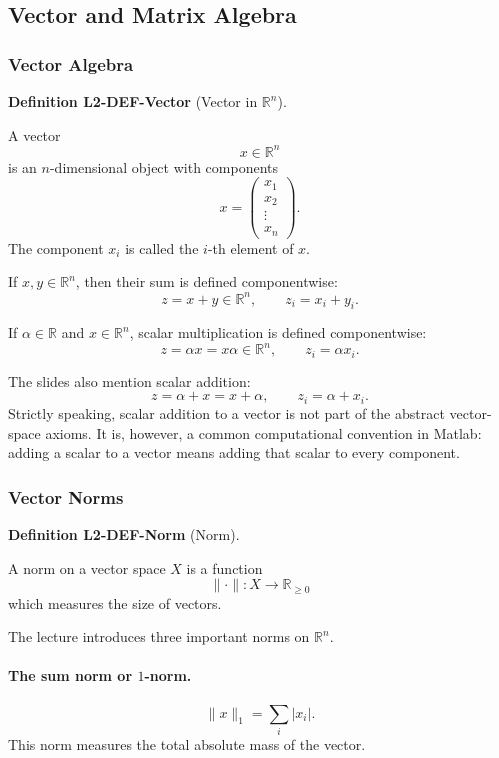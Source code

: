 \documentclass[10pt, letterpaper]{article}
\newcommand{\R}{\mathbb{R}}
\newcommand{\CustomHeading}[3]{%
  \par\medskip\noindent%
  \textbf{#1 #2} \textnormal{(#3)}.\enskip%
}
\newenvironment{DEF}[2]{\CustomHeading{Definition}{#1}{#2}}{}
\begin{document}
\subsection{Vector and Matrix Algebra}

\subsubsection{Vector Algebra}

\begin{DEF}{L2-DEF-Vector}{Vector in \(\R^n\)}
A vector
\[
x\in \R^n
\]
is an \(n\)-dimensional object with components
\[
x=
\begin{pmatrix}
x_1\\
x_2\\
\vdots\\
x_n
\end{pmatrix}.
\]
The component \(x_i\) is called the \(i\)-th element of \(x\).
\end{DEF}

If \(x,y\in\R^n\), then their sum is defined componentwise:
\[
z=x+y\in\R^n,
\qquad
z_i=x_i+y_i.
\]

If \(\alpha\in\R\) and \(x\in\R^n\), scalar multiplication is defined componentwise:
\[
z=\alpha x=x\alpha\in \R^n,
\qquad
z_i=\alpha x_i.
\]

The slides also mention scalar addition:
\[
z=\alpha+x=x+\alpha,
\qquad
z_i=\alpha+x_i.
\]
Strictly speaking, scalar addition to a vector is not part of the abstract vector-space axioms. It is, however, a common computational convention in Matlab: adding a scalar to a vector means adding that scalar to every component.

\subsubsection{Vector Norms}

\begin{DEF}{L2-DEF-Norm}{Norm}
A norm on a vector space \(X\) is a function
\[
\|\cdot\|:X\to \R_{\geq 0}
\]
which measures the size of vectors.
\end{DEF}

The lecture introduces three important norms on \(\R^n\).

\paragraph{The sum norm or \(1\)-norm.}
\[
\|x\|_1=\sum_i |x_i|.
\]
This norm measures the total absolute mass of the vector.
\end{document}

